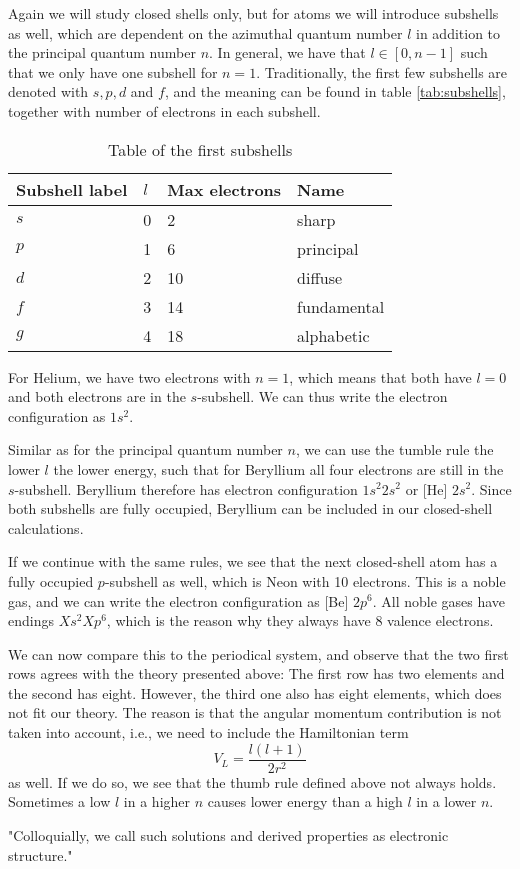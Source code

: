 Again we will study closed shells only, but for atoms we will introduce subshells as well, which are dependent on the azimuthal quantum number $l$ in addition to the principal quantum number $n$. In general, we have that $l\in [0,n-1]$ such that we only have one subshell for $n=1$. Traditionally, the first few subshells are denoted with $s, p, d$ and $f$, and the meaning can be found in table \eqref{tab:subshells}, together with number of electrons in each subshell.

\begin{table} [H]
	\caption{Table of the first subshells  \vspace{2mm}}
	\begin{tabularx}{\textwidth}{X|X:X:X} \hline\hline
		\label{tab:subshells}
		Subshell label & $l$ & Max electrons & Name \\ \hline
		$s$ & 0 & 2 & sharp\\ 
		$p$ & 1 & 6 & principal\\
		$d$ & 2 & 10 & diffuse \\
		$f$ & 3 & 14 & fundamental \\
		$g$ & 4 & 18 & alphabetic \\ \hline\hline
	\end{tabularx}
\end{table}

For Helium, we have two electrons with $n=1$, which means that both have $l=0$ and both electrons are in the $s$-subshell. We can thus write the electron configuration as $1s^2$. 

Similar as for the principal quantum number $n$, we can use the tumble rule the lower $l$ the lower energy, such that for Beryllium all four electrons are still in the $s$-subshell. Beryllium therefore has electron configuration $1s^2 2s^2$ or [He] $2s^2$. Since both subshells are fully occupied, Beryllium can be included in our closed-shell calculations. 

If we continue with the same rules, we see that the next closed-shell atom has a fully occupied $p$-subshell as well, which is Neon with 10 electrons. This is a noble gas, and we can write the electron configuration as [Be] $2p^6$. All noble gases have endings $Xs^2 Xp^6$, which is the reason why they always have 8 valence electrons.

We can now compare this to the periodical system, and observe that the two first rows agrees with the theory presented above: The first row has two elements and the second has eight. However, the third one also has eight elements, which does not fit our theory. The reason is that the angular momentum contribution is not taken into account, i.e., we need to include the Hamiltonian term
\begin{equation}
V_L=\frac{l(l+1)}{2r^2}
\end{equation}
as well. If we do so, we see that the thumb rule defined above not always holds. Sometimes a low $l$ in a higher $n$ causes lower energy than a high $l$ in a lower $n$. 

"Colloquially, we call such solutions and derived properties as electronic structure."

